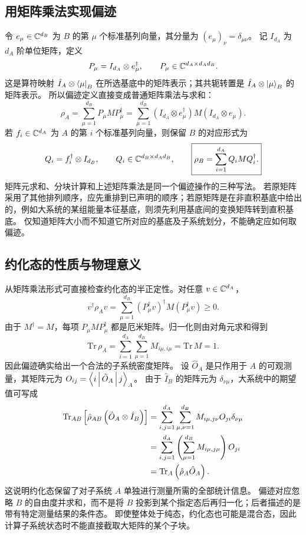 \subsection{用矩阵乘法实现偏迹}
令 $e_\mu\in\mathbb{C}^{d_B}$ 为 $B$ 的第 $\mu$ 个标准基列向量，其分量为 $\left(e_\mu\right)_\nu=\delta_{\mu\nu}$。
记 $I_{d_A}$ 为 $d_A$ 阶单位矩阵，定义
\begin{equation}
P_\mu=I_{d_A}\otimes e_\mu^\dagger,
\qquad P_\mu\in\mathbb{C}^{d_A\times d_Ad_B}.
\end{equation}
这是算符映射 $\hat I_A\otimes\Bra{\mu}_B$ 在所选基底中的矩阵表示；其共轭转置是 $\hat I_A\otimes\Ket{\mu}_B$ 的矩阵表示。
所以偏迹定义直接变成普通矩阵乘法与求和：
\begin{equation}
\boxed{\rho_A=\sum_{\mu=1}^{d_B}P_\mu M P_\mu^\dagger
=\sum_{\mu=1}^{d_B}
\left(I_{d_A}\otimes e_\mu^\dagger\right)
M\left(I_{d_A}\otimes e_\mu\right).}
\end{equation}
若 $f_i\in\mathbb{C}^{d_A}$ 为 $A$ 的第 $i$ 个标准基列向量，则保留 $B$ 的对应形式为
\begin{equation}
Q_i=f_i^\dagger\otimes I_{d_B},\qquad
Q_i\in\mathbb{C}^{d_B\times d_Ad_B},\qquad
\boxed{\rho_B=\sum_{i=1}^{d_A}Q_i M Q_i^\dagger.}
\end{equation}
矩阵元求和、分块计算和上述矩阵乘法是同一个偏迹操作的三种写法。
若原矩阵采用了其他排列顺序，应先重排到已声明的顺序；若原矩阵是在非直积基底中给出的，例如大系统的某组能量本征基底，则须先利用基底间的变换矩阵转到直积基底。
仅知道矩阵大小而不知道它所对应的基底及子系统划分，不能确定应如何取偏迹。

\subsection{约化态的性质与物理意义}
从矩阵乘法形式可直接检查约化态的半正定性。对任意 $v\in\mathbb{C}^{d_A}$，
\begin{equation}
v^\dagger\rho_Av
=\sum_{\mu=1}^{d_B}
\left(P_\mu^\dagger v\right)^\dagger M
\left(P_\mu^\dagger v\right)\geq0.
\end{equation}
由于 $M^\dagger=M$，每项 $P_\mu M P_\mu^\dagger$ 都是厄米矩阵。归一化则由对角元求和得到
\begin{equation}
\mathrm{Tr}\,\rho_A
=\sum_{i=1}^{d_A}\sum_{\mu=1}^{d_B}M_{i\mu,i\mu}
=\mathrm{Tr}\,M=1.
\end{equation}
因此偏迹确实给出一个合法的子系统密度矩阵。
设 $\hat O_A$ 是只作用于 $A$ 的可观测量，其矩阵元为 $O_{ij}=\Braket{i|\hat O_A|j}_A$。
由于 $\hat I_B$ 的矩阵元为 $\delta_{\nu\mu}$，大系统中的期望值可写成
\begin{align}
\mathrm{Tr}_{AB}\left[\hat\rho_{AB}\left(\hat O_A\otimes\hat I_B\right)\right]
&=\sum_{i,j=1}^{d_A}\sum_{\mu,\nu=1}^{d_B}
M_{i\mu,j\nu}O_{ji}\delta_{\nu\mu}\notag\\
&=\sum_{i,j=1}^{d_A}\left(\sum_{\mu=1}^{d_B}M_{i\mu,j\mu}\right)O_{ji}\notag\\
&=\mathrm{Tr}_A\left(\hat\rho_A\hat O_A\right).
\end{align}
这说明约化态保留了对子系统 $A$ 单独进行测量所需的全部统计信息。
偏迹对应忽略 $B$ 的自由度并求和，而不是将 $B$ 投影到某个指定态后再归一化；后者描述的是带有特定测量结果的条件态。
即使整体处于纯态，约化态也可能是混合态，因此计算子系统状态时不能直接截取大矩阵的某个子块。

